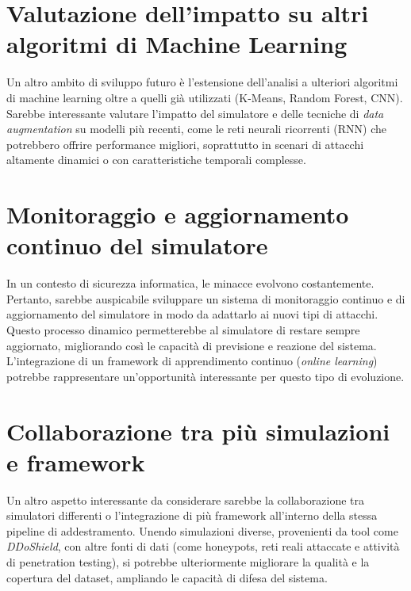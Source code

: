 \section{Valutazione dell'impatto su altri algoritmi di Machine Learning}
Un altro ambito di sviluppo futuro è l'estensione dell'analisi a ulteriori algoritmi di machine learning oltre a quelli già utilizzati (K-Means, Random Forest, CNN). Sarebbe interessante valutare l'impatto del simulatore e delle tecniche di \textit{data augmentation} su modelli più recenti, come le reti neurali ricorrenti (RNN) che potrebbero offrire performance migliori, soprattutto in scenari di attacchi altamente dinamici o con caratteristiche temporali complesse. \cite{RNN}

\section{Monitoraggio e aggiornamento continuo del simulatore}
In un contesto di sicurezza informatica, le minacce evolvono costantemente. Pertanto, sarebbe auspicabile sviluppare un sistema di monitoraggio continuo e di aggiornamento del simulatore in modo da adattarlo ai nuovi tipi di attacchi. Questo processo dinamico permetterebbe al simulatore di restare sempre aggiornato, migliorando così le capacità di previsione e reazione del sistema. L'integrazione di un framework di apprendimento continuo (\textit{online learning}) potrebbe rappresentare un'opportunità interessante per questo tipo di evoluzione.

\section{Collaborazione tra più simulazioni e framework}
Un altro aspetto interessante da considerare sarebbe la collaborazione tra simulatori differenti o l'integrazione di più framework all'interno della stessa pipeline di addestramento. Unendo simulazioni diverse, provenienti da tool come \textit{DDoShield}, con altre fonti di dati (come honeypots, reti reali attaccate e attività di penetration testing), si potrebbe ulteriormente migliorare la qualità e la copertura del dataset, ampliando le capacità di difesa del sistema.
